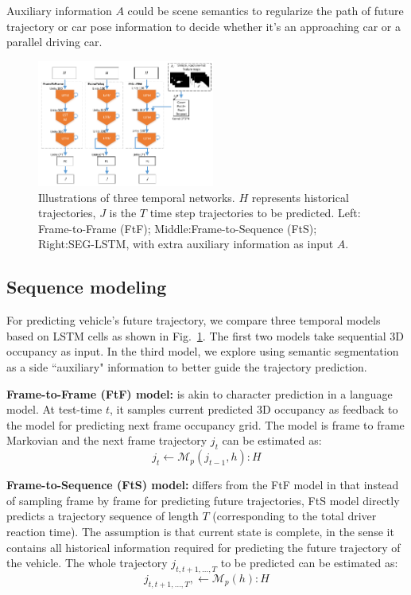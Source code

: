 \documentclass[10pt,twocolumn,letterpaper]{article}
\begin{document}
Auxiliary information $A$ could be scene semantics to regularize the path of future trajectory or car pose information to decide whether it's an approaching car or a parallel driving car.


\begin{figure}[t]
        \centering
        \includegraphics[width=0.52\textwidth]{figures/network_detail.pdf}
        \caption{Illustrations of three temporal networks. $H$ represents historical trajectories, $J$ is the $T$ time step trajectories to be predicted.  Left: Frame-to-Frame (FtF); Middle:Frame-to-Sequence (FtS); Right:SEG-LSTM, with extra auxiliary information as input $A$.}
        \label{fig:lstm}
\end{figure}

\subsection{Sequence modeling}

For predicting vehicle's future trajectory, we compare three temporal models based on LSTM cells  as shown in Fig.~\ref{fig:lstm}. The first two models take sequential 3D occupancy as input. In the third model, we  explore using semantic segmentation as a side ``auxiliary" information to better guide the trajectory prediction.

\vspace{\baselineskip}
\noindent \textbf{Frame-to-Frame (FtF) model:}
is akin to character prediction in a language model.  At test-time $t$, it samples current predicted 3D occupancy as feedback to the model for predicting next frame occupancy grid. The model is frame to frame Markovian and the next frame trajectory $j_t$ can be estimated as:
\begin{equation}
j_t \leftarrow  \bm{\mathcal{M}}_p(j_{t-1}, h): H
\label{eq:FtF}
\end{equation}

\vspace{\baselineskip}
\noindent \textbf{Frame-to-Sequence (FtS) model:}
differs from the FtF model in that instead of sampling frame by frame for predicting future trajectories,   FtS model directly predicts a trajectory sequence of length $T$ (corresponding to the total driver reaction time). The assumption is that current state is complete, in the sense it contains all historical information required for predicting the future trajectory of the vehicle. The whole trajectory  $j_{t, t+1, \ldots, T}$ to be predicted can be estimated as:
\begin{equation}
j_{t, t+1, \ldots, T}, \leftarrow  \bm{\mathcal{M}}_p( h): H
\label{eq:FtS}
\end{equation}
\end{document}
